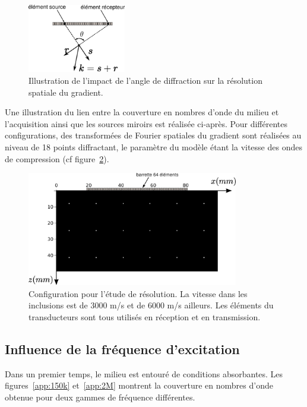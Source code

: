 \begin{figure}[!h]
	\centering
	\includegraphics[height=3cm]{img/reso.png}
	\caption{Illustration de l'impact de l'angle de diffraction sur la résolution spatiale du gradient.\label{app:k1}}
\end{figure}


Une illustration du lien entre la couverture en nombres d'onde du milieu et l'acquisition ainsi que les sources miroirs est réalisée ci-après. Pour différentes configurations, des transformées de Fourier spatiales du gradient sont réalisées au niveau de 18 points diffractant, le paramètre du modèle étant la vitesse des ondes de compression (cf figure~\ref{app:config_reso}).

\begin{figure}[!h]
	\centering
	\includegraphics[height=5cm]{img/vp_scat.png}
	\caption{Configuration pour l'étude de résolution. La vitesse dans les inclusions est de 3000 m/s et de 6000 m/s ailleurs. Les éléments du transducteurs sont tous utilisés en réception et en transmission. \label{app:config_reso}}
\end{figure}


\subsection{Influence de la fréquence d'excitation}

Dans un premier temps, le milieu est entouré de conditions absorbantes. Les figures~\ref{app:150k} et~\ref{app:2M} montrent la couverture en nombres d'onde obtenue pour deux gammes de fréquence différentes. 
    
